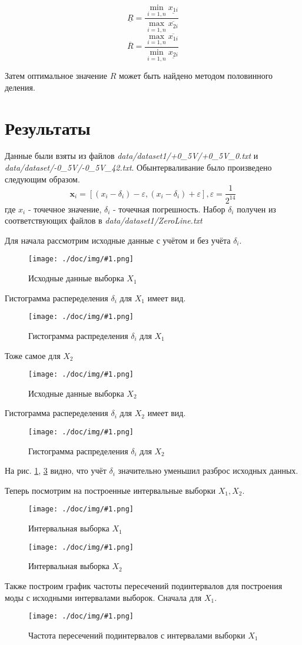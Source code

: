 \documentclass[a4paper,12pt]{article}
\newcommand{\plot}[3]{
    \begin{figure}[H]
        \begin{center}
            \texttt{[image: ./doc/img/\#1.png]}
            \caption{#2}
            \label{#3}
        \end{center}
    \end{figure}
}
\begin{document}
    \label{e:outerRMin}
    \begin{equation}
        \underline{R} = \frac{\min_{i=1,n}\underline{x_{1i}}}{\max_{i=1,n}\overline{x_{2i}}}
    \end{equation}
    \label{e:outerRMax}
    \begin{equation}
        \overline{R} = \frac{\max_{i=1,n}\overline{x_{1i}}}{\min_{i=1,n}\underline{x_{2i}}}
    \end{equation}

    Затем оптимальное значение $ R $ может быть найдено методом половинного деления.

    \section{Результаты}
    \quad Данные были взяты из файлов \textsl{data/dataset1/+0\_5V/+0\_5V\_0.txt} и \textsl{data/dataset/-0\_5V/-0\_5V\_42.txt}.
    Обынтерваливание было произведено следующим образом.
    \begin{equation}
        \textbf{x}_i = [(x_i - \delta_i) - \varepsilon, (x_i - \delta_i) + \varepsilon], \varepsilon = \frac{1}{2^{14}}
    \end{equation}
    где $ x_i $ - точечное значение, $ \delta_i $ - точечная погрешность.
    Набор $ \delta_i $ получен из соответствующих файлов в \textsl{data/dataset1/ZeroLine.txt}

    Для начала рассмотрим исходные данные с учётом и без учёта $ \delta_i $.
    \plot{FixedDataX1}{Исходные данные выборка $ X_1 $}{p:rawSampleX1}
    Гистограмма распеределения $ \delta_i $ для $ X_1 $ имеет вид.
    \plot{DeltasHistX1}{Гистограмма распределения $ \delta_i $ для $ X_1 $}{p:deltasHistX1}

    Тоже самое для $ X_2 $
    \plot{FixedDataX2}{Исходные данные выборка $ X_2 $}{p:rawSampleX2}
    Гистограмма распеределения $ \delta_i $ для $ X_2 $ имеет вид.
    \plot{DeltasHistX2}{Гистограмма распределения $ \delta_i $ для $ X_2 $}{p:deltasHistX2}

    На рис. \ref{p:rawSampleX1}, \ref{p:rawSampleX2} видно, что учёт $ \delta_i $ значительно
    уменьшил разброс исходных данных.
    
    Теперь посмотрим на построенные интервальные выборки $ X_1, X_2 $.
    \plot{_X1}{Интервальная выборка $ X_1 $}{p:x1}
    \plot{_X2}{Интервальная выборка $ X_2 $}{p:x2}

    Также построим график частоты пересечений подинтервалов для построения моды с исходными интервалами выборок.
    Сначала для $ X_1 $.
    \plot{_ModaX1Hist}{Частота пересечений подинтервалов с интервалами выборки $ X_1 $}{p:modaX1}
\end{document}
